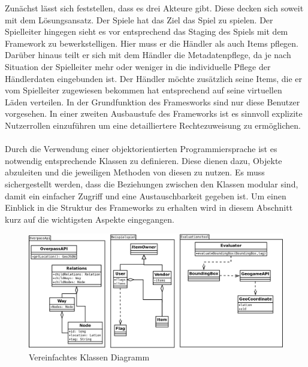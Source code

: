 Zunächst lässt sich feststellen, dass es drei Akteure gibt.
Diese decken sich soweit mit dem Lösungsansatz.
Der Spiele hat das Ziel das Spiel zu spielen. Der Spielleiter hingegen sieht es vor entsprechend das Staging des Spiels mit dem Framework zu bewerkstelligen.
Hier muss er die Händler als auch Items pflegen. Darüber hinaus teilt er sich mit dem Händler die Metadatenpflege, da je nach Situation der Spielleiter mehr oder weniger in die individuelle Pflege der Händlerdaten eingebunden ist. Der Händler möchte zusätzlich seine Items, die er vom Spielleiter zugewiesen bekommen hat entsprechend auf seine virtuellen Läden verteilen. In der Grundfunktion des Framesworks sind nur diese Benutzer vorgesehen. In einer zweiten Ausbaustufe des Frameworks ist es sinnvoll explizite Nutzerrollen einzuführen um eine detailliertere Rechtezuweisung zu ermöglichen.
\\\\
Durch die Verwendung einer objektorientierten Programmiersprache ist es notwendig entsprechende Klassen zu definieren.
Diese dienen dazu, Objekte abzuleiten und die jeweiligen Methoden von diesen zu nutzen.
Es muss sichergestellt werden, dass die Beziehungen zwischen den Klassen modular sind, damit ein einfacher Zugriff und eine Austauschbarkeit gegeben ist.
Um einen Einblick in die Struktur des Frameworks zu erhalten wird in diesem Abschnitt kurz auf die wichtigsten Aspekte eingegangen.


\begin{figure}[H]
\begin{center}
\includegraphics[width=150mm]{images/ch5_img07_classes.png}
\caption{Vereinfachtes Klassen Diagramm}
\label{img:ch5_img07_classes}
\end{center}
\end{figure}

